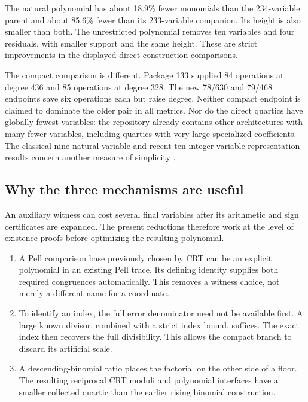 \documentclass[11pt,a4paper]{article}
\theoremstyle{remark}\newtheorem{remark}[theorem]{Remark}
\begin{document}
The natural polynomial has about 18.9\% fewer monomials than the
234-variable parent and about 85.6\% fewer than its 233-variable
companion. Its height is also smaller than both. The unrestricted
polynomial removes ten variables and four residuals, with smaller
support and the same height. These are strict improvements in the
displayed direct-construction comparisons.

The compact comparison is different. Package 133 supplied
84 operations at degree 436 and 85 operations at degree 328. The new
78/630 and 79/468 endpoints save six operations each but raise degree.
Neither compact endpoint is claimed to dominate the older pair in all
metrics. Nor do the direct quartics have globally fewest variables:
the repository already contains other architectures with many fewer
variables, including quartics with very large specialized coefficients.
The classical nine-natural-variable and recent ten-integer-variable
representation results concern another measure of simplicity
\cite{jones,sun}.

\subsection{Why the three mechanisms are useful}

An auxiliary witness can cost several final variables after its
arithmetic and sign certificates are expanded. The present reductions
therefore work at the level of existence proofs before optimizing the
resulting polynomial.

\begin{enumerate}[leftmargin=*]
\item A Pell comparison base previously chosen by CRT can be an explicit
polynomial in an existing Pell trace. Its defining identity supplies
both required congruences automatically. This removes a witness choice,
not merely a different name for a coordinate.
\item To identify an index, the full error denominator need not be
available first. A large known divisor, combined with a strict index
bound, suffices. The exact index then recovers the full divisibility.
This allows the compact branch to discard its artificial scale.
\item A descending-binomial ratio places the factorial on the other
side of a floor. The resulting reciprocal CRT moduli and polynomial
interfaces have a smaller collected quartic than the earlier rising
binomial construction.
\end{enumerate}
\end{document}
